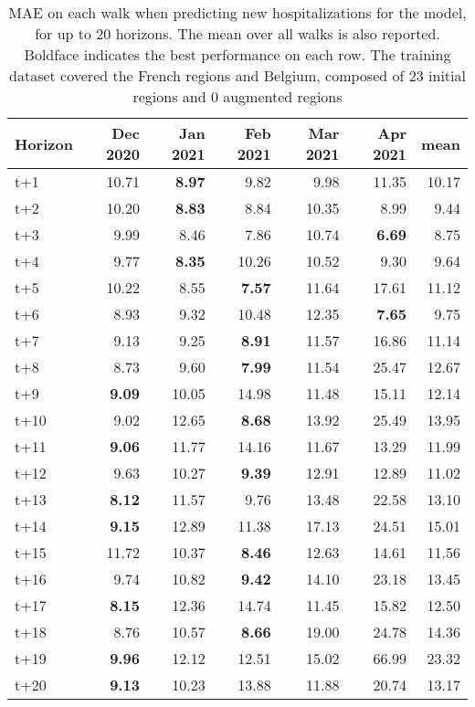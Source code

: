 \begin{table}[H]
\centering
\caption{MAE on each walk when predicting new hospitalizations for the model, for up to 20 horizons. The mean over all walks is also reported. Boldface indicates the best performance on each row. The training dataset covered the French regions and Belgium, composed of 23 initial regions and 0 augmented regions }
\label{tab:MAE_walk_assembly}
\begin{tabular}{lrrrrrr}
\toprule
Horizon &  Dec 2020 &  Jan 2021 &  Feb 2021 &  Mar 2021 &  Apr 2021 &  mean \\
\midrule
t+1  & 10.71  & \textbf{8.97}  & 9.82  & 9.98  & 11.35  & 10.17  \\
t+2  & 10.20  & \textbf{8.83}  & 8.84  & 10.35  & 8.99  & 9.44  \\
t+3  & 9.99  & 8.46  & 7.86  & 10.74  & \textbf{6.69}  & 8.75  \\
t+4  & 9.77  & \textbf{8.35}  & 10.26  & 10.52  & 9.30  & 9.64  \\
t+5  & 10.22  & 8.55  & \textbf{7.57}  & 11.64  & 17.61  & 11.12  \\
t+6  & 8.93  & 9.32  & 10.48  & 12.35  & \textbf{7.65}  & 9.75  \\
t+7  & 9.13  & 9.25  & \textbf{8.91}  & 11.57  & 16.86  & 11.14  \\
t+8  & 8.73  & 9.60  & \textbf{7.99}  & 11.54  & 25.47  & 12.67  \\
t+9  & \textbf{9.09}  & 10.05  & 14.98  & 11.48  & 15.11  & 12.14  \\
t+10  & 9.02  & 12.65  & \textbf{8.68}  & 13.92  & 25.49  & 13.95  \\
t+11  & \textbf{9.06}  & 11.77  & 14.16  & 11.67  & 13.29  & 11.99  \\
t+12  & 9.63  & 10.27  & \textbf{9.39}  & 12.91  & 12.89  & 11.02  \\
t+13  & \textbf{8.12}  & 11.57  & 9.76  & 13.48  & 22.58  & 13.10  \\
t+14  & \textbf{9.15}  & 12.89  & 11.38  & 17.13  & 24.51  & 15.01  \\
t+15  & 11.72  & 10.37  & \textbf{8.46}  & 12.63  & 14.61  & 11.56  \\
t+16  & 9.74  & 10.82  & \textbf{9.42}  & 14.10  & 23.18  & 13.45  \\
t+17  & \textbf{8.15}  & 12.36  & 14.74  & 11.45  & 15.82  & 12.50  \\
t+18  & 8.76  & 10.57  & \textbf{8.66}  & 19.00  & 24.78  & 14.36  \\
t+19  & \textbf{9.96}  & 12.12  & 12.51  & 15.02  & 66.99  & 23.32  \\
t+20  & \textbf{9.13}  & 10.23  & 13.88  & 11.88  & 20.74  & 13.17  \\

\bottomrule
\end{tabular}
\end{table}
